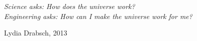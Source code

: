 
\thispagestyle{empty}

\vspace*{\fill}

\begin{center}



    \emph{Science asks: How does the universe work?\\
    Engineering asks: How can I make the universe work for me?
    }
 \end{center}
\begin{flushright}
Lydia Drabsch, 2013
\end{flushright}
\vspace*{\fill}

